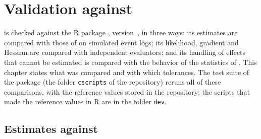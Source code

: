 \chapter{Validation against \texorpdfstring{\relevent}{relevent}}\label{ch:validation}

\nwrem{} is checked against the R package \relevent{}, version~\releventver{}, in three ways: its estimates are compared with those of \relevent{} on simulated event logs; its likelihood, gradient and Hessian are compared with independent evaluators; and its handling of effects that cannot be estimated is compared with the behavior of the statistics of \relevent{}. This chapter states what was compared and with which tolerances. The test suite of the package (the folder \texttt{cscripts} of the repository) reruns all of these comparisons, with the reference values stored in the repository; the scripts that made the reference values in R are in the folder \texttt{dev}.

\section{Estimates against \texorpdfstring{\relevent}{relevent}}\label{sec:val-relevent}

